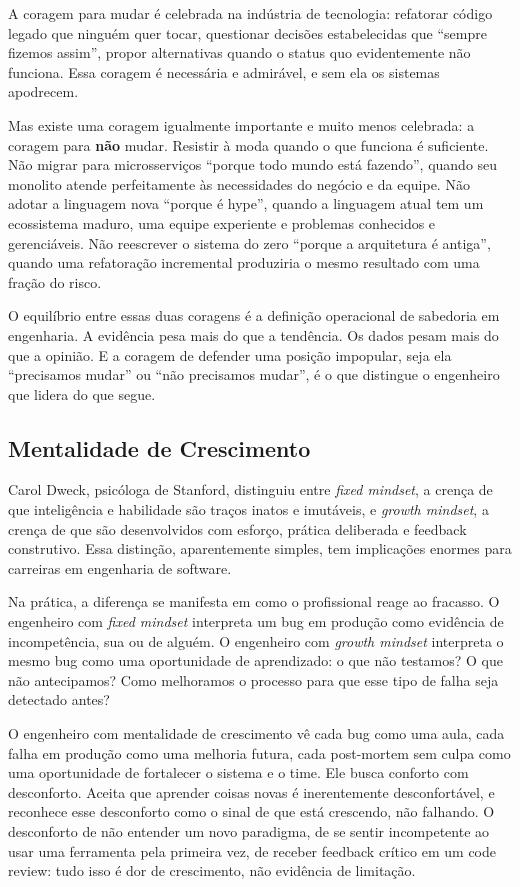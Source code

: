 A coragem para mudar é celebrada na indústria de tecnologia: refatorar código legado que ninguém quer tocar, questionar decisões estabelecidas que ``sempre fizemos assim'', propor alternativas quando o status quo evidentemente não funciona. Essa coragem é necessária e admirável, e sem ela os sistemas apodrecem.

Mas existe uma coragem igualmente importante e muito menos celebrada: a coragem para \textbf{não} mudar. Resistir à moda quando o que funciona é suficiente. Não migrar para microsserviços ``porque todo mundo está fazendo'', quando seu monolito atende perfeitamente às necessidades do negócio e da equipe. Não adotar a linguagem nova ``porque é hype'', quando a linguagem atual tem um ecossistema maduro, uma equipe experiente e problemas conhecidos e gerenciáveis. Não reescrever o sistema do zero ``porque a arquitetura é antiga'', quando uma refatoração incremental produziria o mesmo resultado com uma fração do risco.

O equilíbrio entre essas duas coragens é a definição operacional de sabedoria em engenharia. A evidência pesa mais do que a tendência. Os dados pesam mais do que a opinião. E a coragem de defender uma posição impopular, seja ela ``precisamos mudar'' ou ``não precisamos mudar'', é o que distingue o engenheiro que lidera do que segue.

\subsection{Mentalidade de Crescimento}

Carol Dweck, psicóloga de Stanford, distinguiu entre \textit{fixed
mindset}, a crença de que inteligência e habilidade são traços inatos
e imutáveis, e \textit{growth mindset}, a crença de que são
desenvolvidos com esforço, prática deliberada e feedback construtivo.
Essa distinção, aparentemente simples, tem implicações enormes para
carreiras em engenharia de software.

Na prática, a diferença se manifesta em como o profissional reage ao
fracasso. O engenheiro com \textit{fixed mindset} interpreta um bug em
produção como evidência de incompetência, sua ou de alguém. O
engenheiro com \textit{growth mindset} interpreta o mesmo bug como uma
oportunidade de aprendizado: o que não testamos? O que não antecipamos?
Como melhoramos o processo para que esse tipo de falha seja detectado
antes?

O engenheiro com mentalidade de crescimento vê cada bug como uma aula,
cada falha em produção como uma melhoria futura, cada post-mortem sem
culpa como uma oportunidade de fortalecer o sistema e o time. Ele
busca conforto com desconforto. Aceita que aprender coisas novas é
inerentemente desconfortável, e reconhece esse desconforto como o sinal
de que está crescendo, não falhando. O desconforto de não entender um
novo paradigma, de se sentir incompetente ao usar uma ferramenta pela
primeira vez, de receber feedback crítico em um code review: tudo
isso é dor de crescimento, não evidência de limitação.


